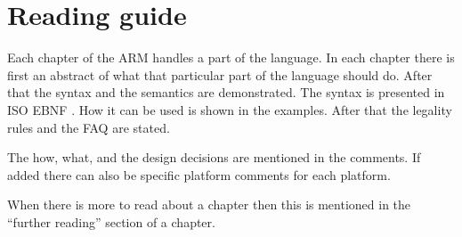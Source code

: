 \chapter*{Reading guide}
Each chapter of the ARM handles a part of the \Compose* language. In each chapter there is first an abstract of what that particular part of the language should do. 
After that the syntax and the semantics are demonstrated.
The syntax is presented in ISO EBNF \cite{scowen1993ebg}.
How it can be used is shown in the examples.
After that the legality rules and the FAQ are stated.

The how, what, and the design decisions are mentioned in the comments. 
If added there can also be specific platform comments for each \Compose* platform.

When there is more to read about a chapter then this is mentioned in the ``further reading'' section of a chapter.
